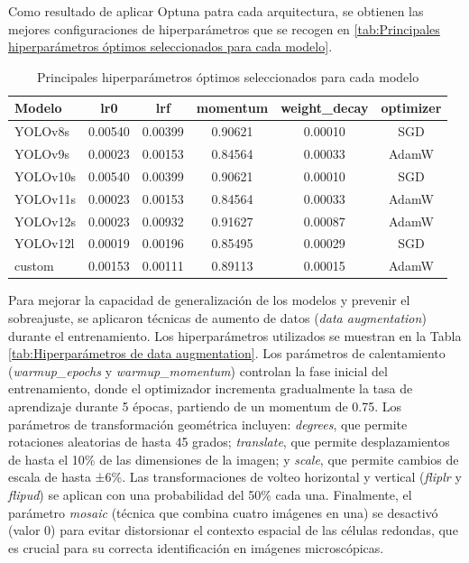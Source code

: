 \documentclass[12pt,a4paper,onecolumn,oneside]{report}
\begin{document}
Como resultado de aplicar Optuna patra cada arquitectura, se obtienen las mejores configuraciones de hiperparámetros que se recogen en \autoref{tab:Principales hiperparámetros óptimos seleccionados para cada modelo}.

\begin{table}[H]
\caption{Principales hiperparámetros óptimos seleccionados para cada modelo}
\label{tab:Principales hiperparámetros óptimos seleccionados para cada modelo}
\centering
\begin{tabular}{lccccc}
\toprule
\textbf{Modelo} & \textbf{lr0} & \textbf{lrf} & \textbf{momentum} & \textbf{weight\_decay} & \textbf{optimizer} \\
\midrule
YOLOv8s   & 0.00540 & 0.00399 & 0.90621 & 0.00010 & SGD \\
YOLOv9s   & 0.00023 & 0.00153 & 0.84564 & 0.00033 & AdamW \\
YOLOv10s  & 0.00540 & 0.00399 & 0.90621 & 0.00010 & SGD \\
YOLOv11s  & 0.00023 & 0.00153 & 0.84564 & 0.00033 & AdamW \\
YOLOv12s  & 0.00023 & 0.00932 & 0.91627 & 0.00087 & AdamW \\
YOLOv12l  & 0.00019 & 0.00196 & 0.85495 & 0.00029 & SGD \\
custom    & 0.00153 & 0.00111 & 0.89113 & 0.00015 & AdamW \\
\bottomrule
\end{tabular}
\end{table}

Para mejorar la capacidad de generalización de los modelos y prevenir el sobreajuste, se aplicaron técnicas de aumento de datos (\textit{data augmentation}) 
durante el entrenamiento. Los hiperparámetros utilizados se muestran en la Tabla \ref{tab:Hiperparámetros de data augmentation}. Los parámetros de calentamiento 
(\textit{warmup\_epochs} y \textit{warmup\_momentum}) controlan la fase inicial del entrenamiento, donde el optimizador incrementa gradualmente la tasa de 
aprendizaje durante 5 épocas, partiendo de un momentum de 0.75. Los parámetros de transformación geométrica incluyen: \textit{degrees}, que permite rotaciones 
aleatorias de hasta 45 grados; \textit{translate}, que permite desplazamientos de hasta el 10\% de las dimensiones de la imagen; y \textit{scale}, que permite 
cambios de escala de hasta ±6\%. Las transformaciones de volteo horizontal y vertical (\textit{fliplr} y \textit{flipud}) se aplican con una probabilidad del 50\% 
cada una. Finalmente, el parámetro \textit{mosaic} (técnica que combina cuatro imágenes en una) se desactivó (valor 0) para evitar distorsionar el contexto 
espacial de las células redondas, que es crucial para su correcta identificación en imágenes microscópicas.
\end{document}
